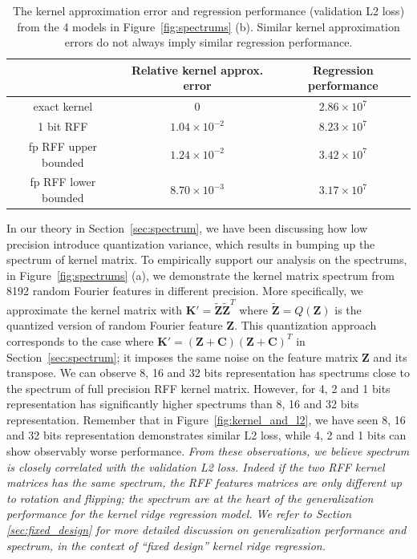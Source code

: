 \begin{table}
\centering
	\begin{tabular}{c | c c}
		& Relative kernel approx. error & Regression performance \\
		\hline
		exact kernel & $0$ & $2.86\times 10^{7}$ \\
		1 bit RFF & $1.04\times 10^{-2}$ & $8.23\times 10^{7}$ \\
		fp RFF upper bounded & $1.24\times 10^{-2}$ & $3.42\times 10^{7}$ \\
		fp RFF lower bounded & $8.70\times 10^{-3}$ & $3.17\times 10^{7}$\\
		\hline
	\end{tabular}
	\caption{The kernel approximation error and regression performance (validation L2 loss) from the 4 models in Figure~\ref{fig:spectrums} (b). Similar kernel approximation errors do not always imply similar regression performance.}
	\label{tab:cor_approx_err_l2}
\end{table}


In our theory in Section~\ref{sec:spectrum}, we have been discussing how low precision introduce quantization variance, which results in bumping up the spectrum of kernel matrix. To empirically support our analysis on the spectrums, in Figure~\ref{fig:spectrums} (a), we demonstrate the kernel matrix spectrum from 8192 random Fourier features in different precision. 
More specifically, we approximate the kernel matrix with $\bm{K}'=\tilde{\bm{Z}}\tilde{\bm{Z}}^T$ where $\tilde{\bm{Z}}=Q(\bm{Z})$ is the quantized version of random Fourier feature $\bm{Z}$. This quantization approach corresponds to the case where $\bm{K}'=(\bm{Z} + \bm{C})(\bm{Z} + \bm{C})^T$ in Section~\ref{sec:spectrum}; it imposes the same noise on the feature matrix $\bm{Z}$ and its transpose.
We can observe 8, 16 and 32 bits representation has spectrums close to the spectrum of full precision RFF kernel matrix. However, for 4, 2 and 1 bits representation has significantly higher spectrums than 8, 16 and 32 bits representation. Remember that in Figure~\ref{fig:kernel_and_l2}, we have seen 8, 16 and 32 bits representation demonstrates similar L2 loss, while 4, 2 and 1 bits can show observably worse performance. \emph{From these observations, we believe spectrum is closely correlated with the validation L2 loss. Indeed if the two RFF kernel matrices has the same spectrum, the RFF features matrices are only different up to rotation and flipping; the spectrum are at the heart of the generalization performance for the kernel ridge regression model. We refer to Section \ref{sec:fixed_design} for more detailed discussion on generalization performance and spectrum, in the context of ``fixed design'' kernel ridge regression.} 


